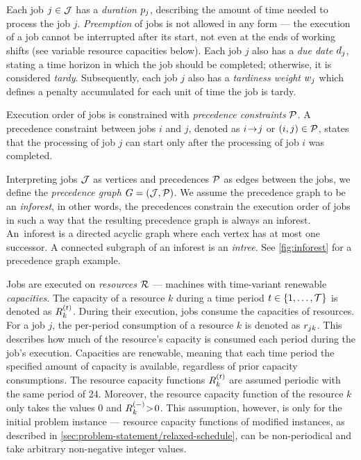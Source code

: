 Each job $j \in \mathcal{J}$ has a \emph{duration} $p_{j}$,
describing the amount of time needed to process the job $j$.
\emph{Preemption} of jobs is not allowed in any form
--- the execution of a job cannot be interrupted after its start,
not even at the ends of working shifts (see variable resource capacities below).
Each job $j$ also has a \emph{due date} $d_{j}$,
stating a time horizon in which the job should be completed;
otherwise, it is considered \emph{tardy}.
Subsequently, each job $j$ also has a \emph{tardiness weight} $w_{j}$
which defines a penalty accumulated for each unit of time the job is tardy.

Execution order of jobs is constrained with \emph{precedence constraints} $\mathcal{P}$.
A precedence constraint between jobs $i$ and $j$,
denoted as $i \hspace{-0.2em} \rightarrow \hspace{-0.2em} j$ or $(i, j) \in \mathcal{P}$,
states that the processing of job $j$ can start only after the processing of job $i$ was completed.

Interpreting jobs $\mathcal{J}$ as vertices and precedences $\mathcal{P}$ as edges between the jobs,
we define the \emph{precedence graph} $G = (\mathcal{J}, \mathcal{P})$.
We assume the precedence graph to be an \emph{inforest}, in other words,
the precedences constrain the execution order of jobs in such a way that the resulting precedence graph
is always an inforest.
An~inforest is a directed acyclic graph where each vertex has at most one successor.
A connected subgraph of an inforest is an \emph{intree}.
See \cref{fig:inforest} for a precedence graph example.

Jobs are executed on \emph{resources} $\mathcal{R}$ --- machines with time-variant renewable \emph{capacities}.
The capacity of a resource $k$ during a time period $t \in \{{1}, \dots, {\mathcal{T}}\}$ is denoted as $\capacity{k}{t}$.
During their execution, jobs consume the capacities of resources.
For a job $j$, the per-period consumption of a resource $k$ is denoted as $r_{j k}$.
This describes how much of the resource's capacity is consumed each period during the job's execution.
Capacities are renewable, meaning that each time period the specified amount of capacity is available,
regardless of prior capacity consumptions.
The resource capacity functions $\capacity{k}{t}$ are assumed periodic with the same period of 24.
Moreover, the resource capacity function of the resource $k$ only takes the values
$0$ and $\shiftcapacity{k} \negmedspace>\! 0$.
This assumption, however, is only for the initial problem instance
--- resource capacity functions of modified instances, as described in \cref{sec:problem-statement/relaxed-schedule},
can be non-periodical and take arbitrary non-negative integer values.

